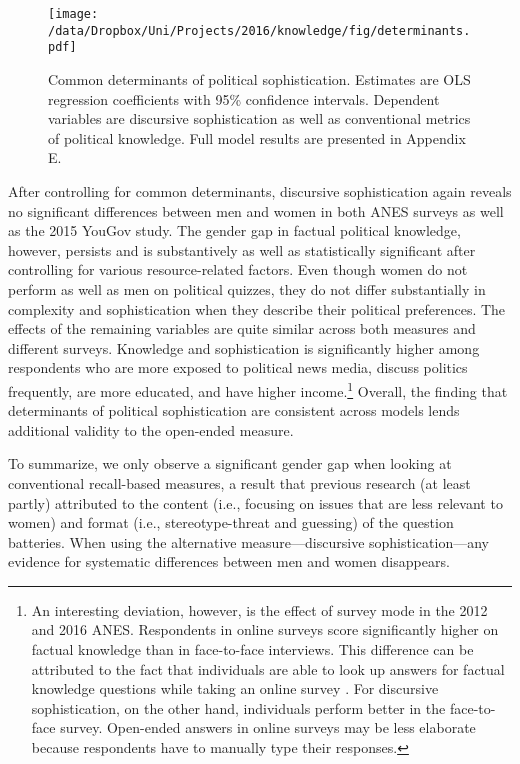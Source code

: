 \begin{figure}[h]\centering
\texttt{[image: /data/Dropbox/Uni/Projects/2016/knowledge/fig/determinants.pdf]}
\caption{Common determinants of political sophistication. Estimates are OLS regression coefficients with 95\% confidence intervals. Dependent variables are discursive sophistication as well as conventional metrics of political knowledge. Full model results are presented in Appendix E.}\label{fig:determinants}
\end{figure}

After controlling for common determinants, discursive sophistication again reveals no significant differences between men and women in both ANES surveys as well as the 2015 YouGov study. The gender gap in factual political knowledge, however, persists and is substantively as well as statistically significant after controlling for various resource-related factors. Even though women do not perform as well as men on political quizzes, they do not differ substantially in complexity and sophistication when they describe their political preferences. The effects of the remaining variables are quite similar across both measures and different surveys. Knowledge and sophistication is significantly higher among respondents who are more exposed to political news media, discuss politics frequently, are more educated, and have higher income.\footnote{An interesting deviation, however, is the effect of survey mode in the 2012 and 2016 ANES. Respondents in online surveys score significantly higher on factual knowledge than in face-to-face interviews. This difference can be attributed to the fact that individuals are able to look up answers for factual knowledge questions while taking an online survey \citep[c.f.,][]{clifford2016cheating}. For discursive sophistication, on the other hand, individuals perform better in the face-to-face survey. Open-ended answers in online surveys may be less elaborate because respondents have to manually type their responses.} Overall, the finding that determinants of political sophistication are consistent across models lends additional validity to the open-ended measure.

To summarize, we only observe a significant gender gap when looking at conventional recall-based measures, a result that previous research (at least partly) attributed to the content (i.e., focusing on issues that are less relevant to women) and format (i.e., stereotype-threat and guessing) of the question batteries. When using the alternative measure---discursive sophistication---any evidence for systematic differences between men and women disappears.


